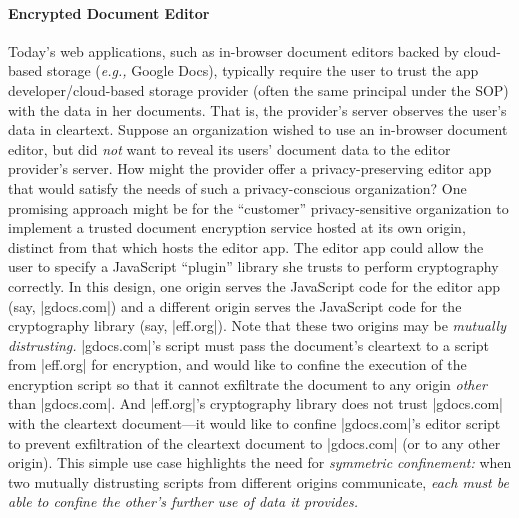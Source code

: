 \paragraph{Encrypted Document Editor}
Today's web applications, such as in-browser document editors backed
by cloud-based storage (\emph{e.g.,} Google Docs), typically require the user
to trust the app developer/cloud-based storage provider (often the
same principal under the SOP) with the data in her documents. That is,
the provider's server observes the user's data in cleartext. Suppose
an organization wished to use an in-browser document editor, but did
{\em not} want to reveal its users' document data to the editor
provider's server. How might the provider offer a privacy-preserving
editor app that would satisfy the needs of such a privacy-conscious
organization?  One promising approach might be for the ``customer''
privacy-sensitive organization to implement a trusted document encryption
service hosted at its own origin, distinct from that which hosts the
editor app. The editor app could allow the user to specify a JavaScript
``plugin'' library she trusts to perform cryptography correctly. In this design,
one origin serves the JavaScript code for the editor app (say,
\js|gdocs.com|) and a different origin serves the JavaScript code for
the cryptography library (say, \js|eff.org|). Note that these two
origins may be {\em mutually distrusting.}  \js|gdocs.com|'s script
must pass the document's cleartext to a script from \js|eff.org| for
encryption, and would like to confine the execution of the encryption
script so that it cannot exfiltrate the document to any origin {\em
other} than \js|gdocs.com|. And \js|eff.org|'s cryptography library
does not trust \js|gdocs.com| with the cleartext document---it would
like to confine \js|gdocs.com|'s editor script to prevent
exfiltration of the cleartext document to \js|gdocs.com| (or to any
other origin).
%
This simple use case highlights the need for {\em
  symmetric confinement:} when two mutually distrusting scripts from
different origins communicate, {\em each must be able to confine the
  other's further use of data it provides.}
%

